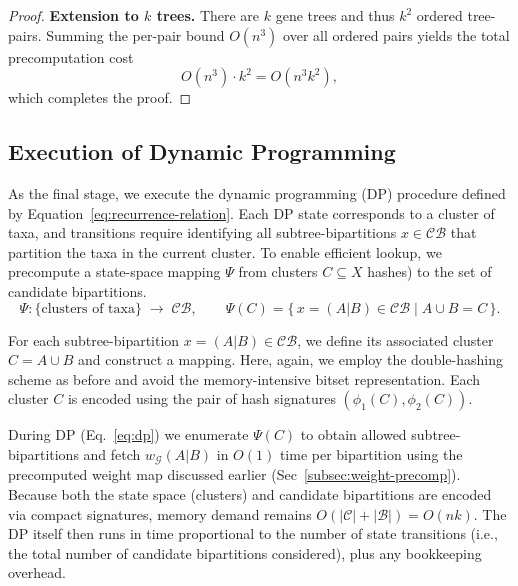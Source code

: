 \documentclass[10pt,a4paper]{article}
\newcommand{\addb}[1]{{\color{red} #1}}
\begin{document}
\begin{proof}
\medskip\noindent\textbf{Extension to \(k\) trees.}
There are \(k\) gene trees and thus \(k^{2}\) ordered tree-pairs. Summing
the per-pair bound \(O(n^{3})\) over all ordered pairs yields the total
precomputation cost
\[
O(n^{3})\cdot k^{2} = O(n^{3} k^{2}),
\]
which completes the proof.
\end{proof}













\subsection{Execution of Dynamic Programming}
\label{subsec:dp}

As the final stage, we execute the dynamic programming (DP) procedure defined by Equation~\eqref{eq:recurrence-relation}. Each DP state corresponds to a cluster of taxa, and transitions require identifying all subtree-bipartitions $x \in \mathcal{CB}$ that partition the taxa in the current cluster. To enable efficient lookup, we precompute a state-space mapping $\Psi$ from clusters $C\subseteq X$ hashes) to the set of candidate bipartitions. 
\[
\Psi : \{\text{clusters of taxa}\} \;\longrightarrow\; \mathcal{CB},
\qquad 
\Psi(C) = \{\, x = (A|B) \in \mathcal{CB} \mid A \cup B = C \,\}.
\]

For each subtree-bipartition $x = (A|B) \in \mathcal{CB}$, we define its associated cluster $C = A \cup B$ and construct a mapping. Here, again, we employ the double-hashing scheme as before and avoid the memory-intensive bitset representation. Each cluster $C$ is encoded using the pair of hash signatures $(\phi_1(C), \phi_2(C))$.

During DP (Eq.~\ref{eq:dp}) we enumerate $\Psi(C)$ to obtain allowed subtree-bipartitions and fetch $w_{\mathcal{G}}(A|B)$ in $O(1)$ time per bipartition using the precomputed weight map discussed earlier (Sec~\ref{subsec:weight-precomp}). Because both the state space (clusters) and candidate bipartitions are encoded via compact signatures, memory demand remains $O(|\mathcal{C}|+|\mathcal{B}|)=O(nk)$. The DP itself then runs in time proportional to the number of state transitions (i.e., the total number of candidate bipartitions considered), plus any bookkeeping overhead.
\end{document}
